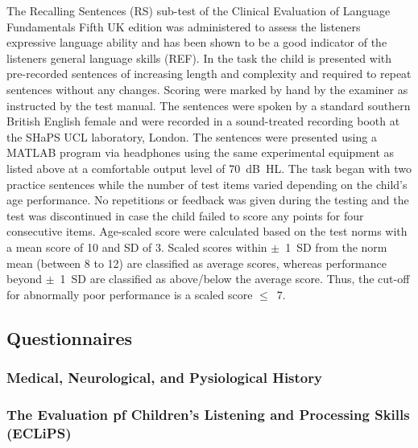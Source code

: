 \documentclass[a4paper, twoside]{templates/ociamthesis}
\begin{document}
The Recalling Sentences (RS) sub-test of the Clinical Evaluation of Language Fundamentals Fifth UK edition \autocite[CELF-5-UK][]{HWiig2017} was administered to assess the listeners expressive language ability and has been shown to be a good indicator of the listeners general language skills (REF). In the task the child is presented with pre-recorded sentences of increasing length and complexity and required to repeat sentences without any changes. Scoring were marked by hand by the examiner as instructed by the test manual. The sentences were spoken by a standard southern British English female and were recorded in a sound-treated recording booth at the SHaPS UCL laboratory, London. The sentences were presented using a MATLAB program via headphones using the same experimental equipment as listed above at a comfortable output level of 70~dB~HL. The task began with two practice sentences while the number of test items varied depending on the child's age performance. No repetitions or feedback was given during the testing and the test was discontinued in case the child failed to score any points for four consecutive items. Age-scaled score were calculated based on the test norms with a mean score of 10 and SD of 3. Scaled scores within \(\pm\)~1~SD from the norm mean (between 8 to 12) are classified as average scores, whereas performance beyond \(\pm\)~1~SD are classified as above/below the average score. Thus, the cut-off for abnormally poor performance is a scaled score \(\leq\)~7.

\hypertarget{questionnaires}{%
\subsection{Questionnaires}\label{questionnaires}}

\hypertarget{medical-neurological-and-pysiological-history}{%
\subsubsection*{Medical, Neurological, and Pysiological History}\label{medical-neurological-and-pysiological-history}}

\hypertarget{the-evaluation-pf-childrens-listening-and-processing-skills-eclips}{%
\subsubsection*{The Evaluation pf Children's Listening and Processing Skills (ECLiPS)}\label{the-evaluation-pf-childrens-listening-and-processing-skills-eclips}}
\end{document}
